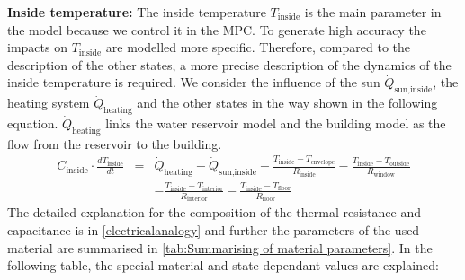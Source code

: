    \textbf{Inside temperature:}\newline
    The inside temperature $T_\text{inside}$ is the main parameter in the model because we control it in the MPC. To generate high accuracy the impacts on $T_\text{inside}$ are modelled more specific. Therefore, compared to the description of the other states, a more precise description of the dynamics of the inside temperature is required. We consider the influence of the sun $\dot{Q}_\text{sun,inside}$, the heating system $\dot{Q}_\text{heating}$ and the other states in the way shown in the following equation. $\dot{Q}_\text{heating}$ links the water reservoir model and the building model as the flow from the reservoir to the building. 
    \begin{align}
        \label{eq:1.state}
        C_\text{inside}\cdot \frac{d T_\text{inside}}{d t} &=& \dot{Q}_\text{heating} + \dot{Q}_\text{sun,inside} - \frac{T_\text{inside}-T_\text{envelope}}{R_\text{inside}} - \frac{T_\text{inside}-T_\text{outside}}{R_\text{window}} \\
       & &-\frac{T_\text{inside}-T_\text{interior}}{R_\text{interior}}-\frac{T_\text{inside}-T_\text{floor}}{R_\text{floor}}\nonumber
    \end{align}
    The detailed explanation for the composition of the thermal resistance and capacitance is in \autoref{electricalanalogy} and further the parameters of the used material are summarised in \autoref{tab:Summarising of material parameters}. In the following table, the special material and state dependant values are explained:
